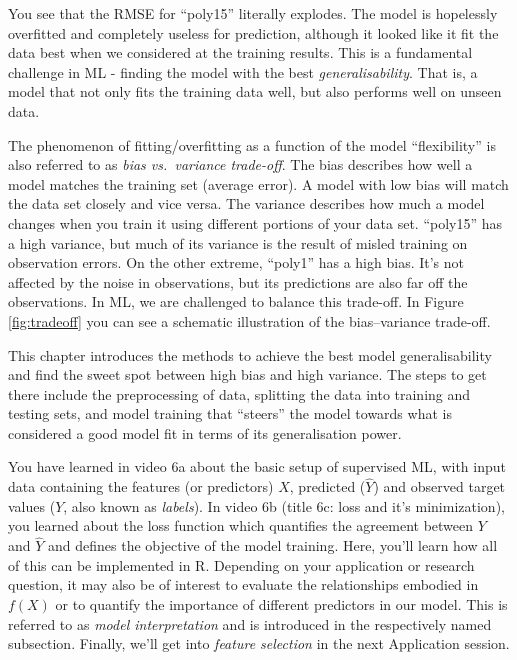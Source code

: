 \documentclass[
]{book}
\begin{document}
You see that the RMSE for ``poly15'' literally explodes. The model is hopelessly overfitted and completely useless for prediction, although it looked like it fit the data best when we considered at the training results. This is a fundamental challenge in ML - finding the model with the best \emph{generalisability}. That is, a model that not only fits the training data well, but also performs well on unseen data.

The phenomenon of fitting/overfitting as a function of the model ``flexibility'' is also referred to as \emph{bias vs.~variance trade-off}. The bias describes how well a model matches the training set (average error). A model with low bias will match the data set closely and vice versa. The variance describes how much a model changes when you train it using different portions of your data set. ``poly15'' has a high variance, but much of its variance is the result of misled training on observation errors. On the other extreme, ``poly1'' has a high bias. It's not affected by the noise in observations, but its predictions are also far off the observations. In ML, we are challenged to balance this trade-off. In Figure \ref{fig:tradeoff} you can see a schematic illustration of the bias--variance trade-off.

This chapter introduces the methods to achieve the best model generalisability and find the sweet spot between high bias and high variance. The steps to get there include the preprocessing of data, splitting the data into training and testing sets, and model training that ``steers'' the model towards what is considered a good model fit in terms of its generalisation power.

You have learned in video 6a about the basic setup of supervised ML, with input data containing the features (or predictors) \(X\), predicted (\(\hat{Y}\)) and observed target values (\(Y\), also known as \emph{labels}). In video 6b (title 6c: loss and it's minimization), you learned about the loss function which quantifies the agreement between \(Y\) and \(\hat{Y}\) and defines the objective of the model training. Here, you'll learn how all of this can be implemented in R. Depending on your application or research question, it may also be of interest to evaluate the relationships embodied in \(f(X)\) or to quantify the importance of different predictors in our model. This is referred to as \emph{model interpretation} and is introduced in the respectively named subsection. Finally, we'll get into \emph{feature selection} in the next Application session.
\end{document}
